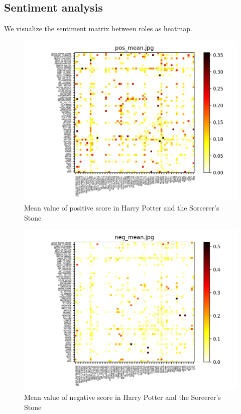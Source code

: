 \documentclass[11pt]{article}
\begin{document}
\subsection{Sentiment analysis}
    We visualize the sentiment matrix between roles as heatmap.
    \begin{figure}[H]
        \centering
        \includegraphics[width=\linewidth]{images/pos_mean.jpg}
        \caption{Mean value of positive score in Harry Potter and the Sorcerer's Stone}
    \end{figure}
    \begin{figure}[H]
        \centering
        \includegraphics[width=\linewidth]{images/neg_mean.jpg}
        \caption{Mean value of negative score in Harry Potter and the Sorcerer's Stone}
    \end{figure}
\end{document}
